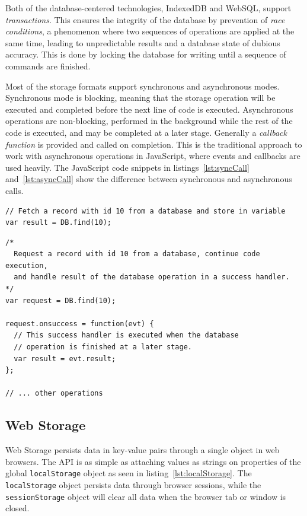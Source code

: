 Both of the database-centered technologies, IndexedDB and WebSQL, support \emph{transactions}. This ensures the integrity of the database by prevention of \emph{race conditions}, a phenomenon where two sequences of operations are applied at the same time, leading to unpredictable results and a database state of dubious accuracy. This is done by locking the database for  writing until a sequence of commands are finished.

Most of the storage formats support synchronous and asynchronous modes. Synchronous mode is blocking, meaning that the storage operation will be executed and completed before the next line of code is executed. Asynchronous operations are non-blocking, performed in the background while the rest of the code is executed, and may be completed at a later stage. Generally a \emph{callback function} is provided and called on completion. This is the traditional approach to work with asynchronous operations in JavaScript, where events and callbacks are used heavily. The JavaScript code snippets in listings~\ref{lst:syncCall} and~\ref{lst:asyncCall} show the difference between synchronous and asynchronous calls.

\begin{Code}
\begin{lstlisting}[caption={Synchronous call}, label={lst:syncCall}]
// Fetch a record with id 10 from a database and store in variable
var result = DB.find(10);
\end{lstlisting}

\begin{lstlisting}[caption={Asynchronous call}, label={lst:asyncCall}]
/*
  Request a record with id 10 from a database, continue code execution,
  and handle result of the database operation in a success handler.
*/
var request = DB.find(10);

request.onsuccess = function(evt) {
  // This success handler is executed when the database
  // operation is finished at a later stage.
  var result = evt.result;
};

// ... other operations

\end{lstlisting}
\end{Code}


\subsection{Web Storage}
Web Storage persists data in key-value pairs through a single object in web browsers. The API is as simple as attaching values as strings on properties of the global \texttt{localStorage} object as seen in listing~\ref{lst:localStorage}. The \texttt{localStorage} object persists data through browser sessions, while the \texttt{sessionStorage} object will clear all data when the browser tab or window is closed.


